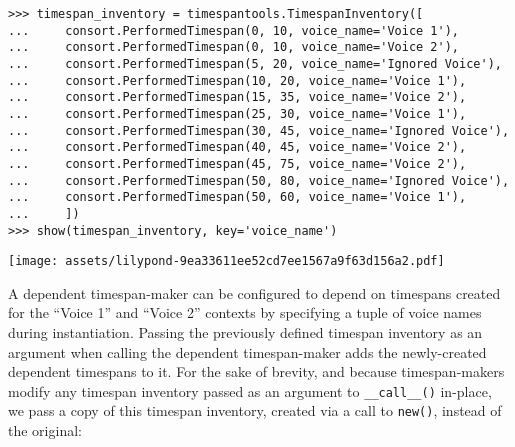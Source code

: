\begin{abjadbookoutput}
\begin{singlespacing}
\vspace{-0.5\baselineskip}
\begin{verbatim}
>>> timespan_inventory = timespantools.TimespanInventory([
...     consort.PerformedTimespan(0, 10, voice_name='Voice 1'),
...     consort.PerformedTimespan(0, 10, voice_name='Voice 2'),
...     consort.PerformedTimespan(5, 20, voice_name='Ignored Voice'),
...     consort.PerformedTimespan(10, 20, voice_name='Voice 1'),
...     consort.PerformedTimespan(15, 35, voice_name='Voice 2'),
...     consort.PerformedTimespan(25, 30, voice_name='Voice 1'),
...     consort.PerformedTimespan(30, 45, voice_name='Ignored Voice'),
...     consort.PerformedTimespan(40, 45, voice_name='Voice 2'),
...     consort.PerformedTimespan(45, 75, voice_name='Voice 2'),
...     consort.PerformedTimespan(50, 80, voice_name='Ignored Voice'),
...     consort.PerformedTimespan(50, 60, voice_name='Voice 1'),
...     ])
>>> show(timespan_inventory, key='voice_name')
\end{verbatim}
\noindent\texttt{[image: assets/lilypond-9ea33611ee52cd7ee1567a9f63d156a2.pdf]}
\end{singlespacing}
\end{abjadbookoutput}

\noindent A dependent timespan-maker can be configured to depend on timespans
created for the \enquote{Voice 1} and \enquote{Voice 2} contexts by specifying
a tuple of voice names during instantiation. Passing the previously defined
timespan inventory as an argument when calling the dependent timespan-maker
adds the newly-created dependent timespans to it. For the sake of brevity, and
because timespan-makers modify any timespan inventory passed as an argument to
\texttt{\_\_call\_\_()} in-place, we pass a copy of this timespan inventory,
created via a call to \texttt{new()}, instead of the original:

\begin{comment}
<abjad>
music_specifiers = {'Dependent Voice': None}
dependent_timespan_maker = consort.DependentTimespanMaker(
    voice_names=(
        'Voice 1',
        'Voice 2',
        )
    )
result = dependent_timespan_maker(
    music_specifiers=music_specifiers,
    timespan_inventory=new(timespan_inventory),
    )
show(result, key='voice_name')
</abjad>
\end{comment}

